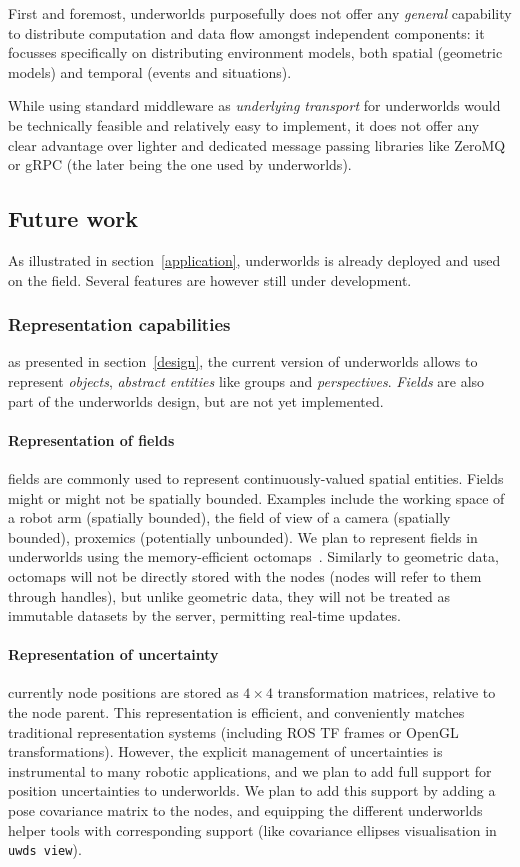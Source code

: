 \documentclass[conference]{IEEEtran}
\newcommand{\uwds}{{\sc underworlds}\xspace}
\begin{document}
First and foremost, \uwds purposefully does not offer any \emph{general}
capability to distribute computation and data flow amongst independent
components: it focusses specifically on distributing environment models, both
spatial (geometric models) and temporal (events and situations).

While using standard middleware as \emph{underlying transport} for \uwds would be
technically feasible and relatively easy to implement, it does not offer any
clear advantage over lighter and dedicated message passing libraries like ZeroMQ
or gRPC (the later being the one used by \uwds).

\subsection{Future work}
\label{futurework}

As illustrated in section~\ref{application}, \uwds is already deployed and used
on the field. Several features are however still under development.

\subsubsection{Representation capabilities} as presented in
section~\ref{design}, the current version of \uwds allows to represent
\emph{objects}, \emph{abstract entities} like groups and \emph{perspectives}.
\emph{Fields} are also part of the \uwds design, but are not yet implemented.

\paragraph*{Representation of fields} fields are commonly used to represent
continuously-valued spatial entities. Fields might or might not be spatially
bounded. Examples include the working space of a robot arm (spatially bounded),
the field of view of a camera (spatially bounded), proxemics (potentially
unbounded). We plan to represent fields in \uwds using the memory-efficient
octomaps~\cite{hornung2013octomap}. Similarly to geometric data, octomaps
will not be directly stored with the nodes (nodes will refer to them through 
handles), but unlike geometric data, they will not be treated as immutable
datasets by the server, permitting real-time updates.

\paragraph*{Representation of uncertainty} currently node positions are 
stored as $4\times4$ transformation matrices, relative to the node parent. This
representation is efficient, and conveniently matches traditional representation
systems (including ROS TF frames or OpenGL transformations). However, the explicit management
of uncertainties is instrumental to many robotic applications, and we plan to
add full support for position uncertainties to \uwds. We plan to add this
support by adding a pose covariance matrix to the nodes, and equipping the
different \uwds helper tools with corresponding support (like covariance
ellipses visualisation in {\tt uwds view}).
\end{document}
